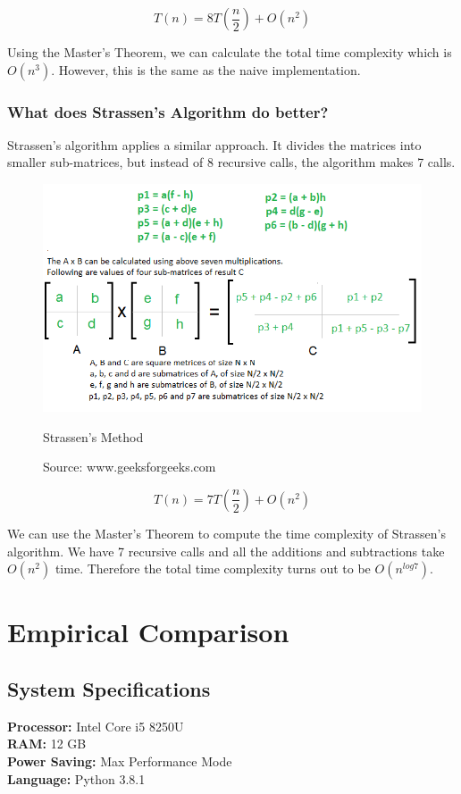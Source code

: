 \documentclass{article}
\begin{document}
\begin{equation*}
    T(n) = 8T(\frac{n}{2}) + O(n^2)
\end{equation*}

Using the Master's Theorem, we can calculate the total time complexity which is $O(n^3)$. However, this is the same as the naive implementation.

\subsubsection{What does Strassen's Algorithm do better?}
Strassen's algorithm applies a similar approach. It divides the matrices into smaller sub-matrices, but instead of 8 recursive calls, the algorithm makes 7 calls.
\newpage
\begin{figure}[h!]
    \centering
    \includegraphics[scale=0.7]{strassen.png}
    \caption{Strassen's Method}
    \caption*{Source: www.geeksforgeeks.com}
\end{figure}

\begin{equation*}
    T(n) = 7T(\frac{n}{2}) + O(n^2)
\end{equation*}

We can use the Master's Theorem to compute the time complexity of Strassen's algorithm. We have 7 recursive calls and all the additions and subtractions take $O(n^2)$ time. Therefore the total time complexity turns out to be $O(n^{log 7})$.






\section{Empirical Comparison}
\subsection{System Specifications}
\textbf{Processor:} Intel Core i5 8250U\\
\textbf{RAM:} 12 GB\\
\textbf{Power Saving:} Max Performance Mode\\
\textbf{Language:} Python 3.8.1\\
\end{document}
